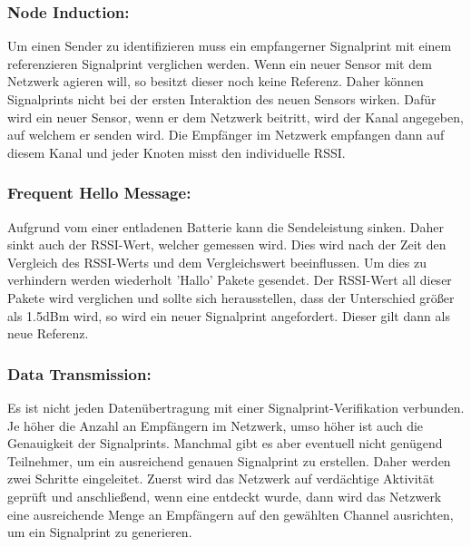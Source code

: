 \documentclass[12pt,a4paper]{article}
\begin{document}
	\subsubsection*{Node Induction:}
		Um einen Sender zu identifizieren muss ein empfangerner Signalprint mit einem referenzieren Signalprint verglichen werden. Wenn ein neuer Sensor mit dem Netzwerk agieren will, so besitzt dieser noch keine Referenz.  Daher können Signalprints nicht bei der ersten Interaktion des neuen Sensors wirken. Dafür wird ein neuer Sensor, wenn er dem Netzwerk beitritt, wird der Kanal angegeben, auf welchem er senden wird. Die Empfänger im Netzwerk empfangen dann auf diesem Kanal und jeder Knoten misst den individuelle RSSI. 
	\subsubsection*{Frequent Hello Message:}
		Aufgrund vom einer entladenen Batterie kann die Sendeleistung sinken. Daher sinkt auch der RSSI-Wert, welcher gemessen wird. Dies wird nach der Zeit den Vergleich des RSSI-Werts und dem Vergleichswert beeinflussen. Um dies zu verhindern werden wiederholt 'Hallo' Pakete gesendet. Der RSSI-Wert all dieser Pakete wird verglichen und sollte sich herausstellen, dass der Unterschied größer als 1.5dBm wird, so wird ein neuer Signalprint angefordert. Dieser gilt dann als neue Referenz.
	\subsubsection*{Data Transmission:}
		Es ist nicht jeden Datenübertragung mit einer Signalprint-Verifikation verbunden. Je höher die Anzahl an Empfängern im Netzwerk, umso höher ist auch die Genauigkeit der Signalprints. Manchmal gibt es aber eventuell nicht genügend Teilnehmer, um ein ausreichend genauen Signalprint zu erstellen. Daher werden zwei Schritte eingeleitet. Zuerst wird das Netzwerk auf verdächtige Aktivität geprüft und anschließend, wenn eine entdeckt wurde, dann wird das Netzwerk eine ausreichende Menge an Empfängern auf den gewählten Channel ausrichten, um ein Signalprint zu generieren.
\end{document}
